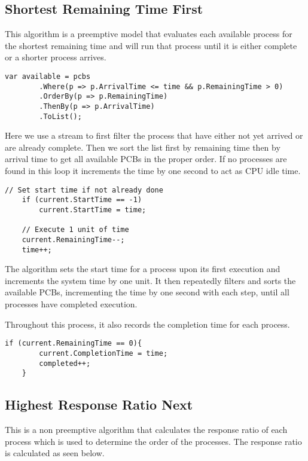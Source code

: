 \documentclass[conference]{report}
\begin{document}
\subsection*{Shortest Remaining Time First}
This algorithm is a preemptive model that evaluates each available process for the shortest remaining time and will run that process until it is either complete or a shorter process arrives.

\hfill
\begin{lstlisting}[caption={SRTF Finding Available Processes}, label=code:srtf-1]
    var available = pcbs
        .Where(p => p.ArrivalTime <= time && p.RemainingTime > 0)
        .OrderBy(p => p.RemainingTime)
        .ThenBy(p => p.ArrivalTime)
        .ToList();
\end{lstlisting}

Here we use a stream to first filter the process that have either not yet arrived or are already complete. Then we sort the list first by remaining time then by arrival time to get all available PCBs in the proper order. If no processes are found in this loop it increments the time by one second to act as CPU idle time.

\hfill
\begin{lstlisting}[caption={SRTF Increment Time}, label=code:srtf-2]
    // Set start time if not already done
    if (current.StartTime == -1)
        current.StartTime = time;

    // Execute 1 unit of time
    current.RemainingTime--;
    time++;
\end{lstlisting}

The algorithm sets the start time for a process upon its first execution and increments the system time by one unit. It then repeatedly filters and sorts the available PCBs, incrementing the time by one second with each step, until all processes have completed execution.

Throughout this process, it also records the completion time for each process.

\hfill
\begin{lstlisting}[caption={SRTF Set Completed time}, label=code:srtf-3]
    if (current.RemainingTime == 0){
        current.CompletionTime = time;
        completed++;
    }
\end{lstlisting}

\subsection*{Highest Response Ratio Next}
This is a non preemptive algorithm that calculates the response ratio of each process which is used to determine the order of the processes. The response ratio is calculated as seen below.
\end{document}
